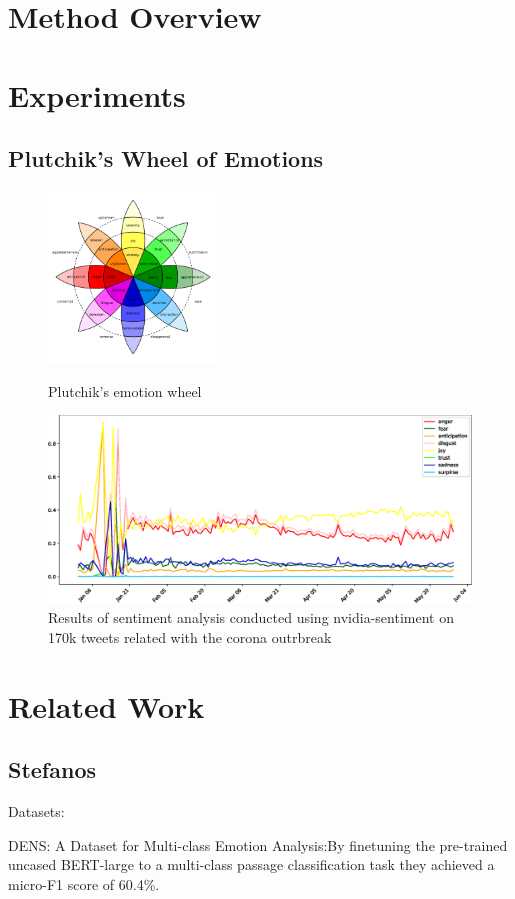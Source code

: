 \documentclass[11pt]{article}
\begin{document}
\section{Method Overview}
\label{sec:method}

\section{Experiments}
\label{sec:experiments}


\subsection{Plutchik's Wheel of Emotions}

\begin{figure}[!ht]
    \includegraphics[width=0.4\textwidth]{images/Plutchik-wheel.png}
    \caption{Plutchik's emotion wheel}
    \label{fig:2}
    \includegraphics[width=\textwidth]{images/emotions.eps}
    \caption{Results of sentiment analysis conducted using nvidia-sentiment on 170k tweets related with the corona outrbreak }
    \label{fig:3}
\end{figure}
\newpage

\section{Related Work}
\label{sec:related}
\subsection{Stefanos}
Datasets: 
\begin{enumarate}
  \item DENS: A Dataset for Multi-class Emotion Analysis:By finetuning the pre-trained uncased BERT-large to a multi-class passage classification task they achieved a micro-F1 score of 60.4\%. 
  \item 
\end{enumarate}
 
\end{document}
